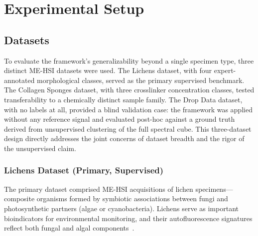 \section{Experimental Setup}
\label{sec:experimental_setup}

\subsection{Datasets}
\label{sec:datasets}

To evaluate the framework's generalizability beyond a single specimen type, three distinct ME-HSI datasets were used.
The Lichens dataset, with four expert-annotated morphological classes, served as the primary supervised benchmark.
The Collagen Sponges dataset, with three crosslinker concentration classes, tested transferability to a chemically distinct sample family.
The Drop Data dataset, with no labels at all, provided a blind validation case: the framework was applied without any reference signal and evaluated post-hoc against a ground truth derived from unsupervised clustering of the full spectral cube.
This three-dataset design directly addresses the joint concerns of dataset breadth and the rigor of the unsupervised claim.

\subsubsection{Lichens Dataset (Primary, Supervised)}
\label{sec:dataset_lichens}

The primary dataset comprised ME-HSI acquisitions of lichen specimens---composite organisms formed by symbiotic associations between fungi and photosynthetic partners (algae or cyanobacteria).
Lichens serve as important bioindicators for environmental monitoring, and their autofluorescence signatures reflect both fungal and algal components~\cite{meysurova2021optical}.

